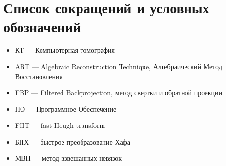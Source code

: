 \chapter*{Список сокращений и условных обозначений}
\begin{itemize}
\item КТ --- Компьютерная томография
\item ART --- Algebraic Reconstruction Technique, Алгебраический Метод Восстановления
\item FBP --- Filtered Backprojection, метод свертки и обратной проекции
\item ПО --- Программное Обеспечение
\item FHT --- fast Hough transform
\item БПХ --- быстрое преобразование Хафа
\item МВН --- метод взвешанных невязок
\end{itemize}